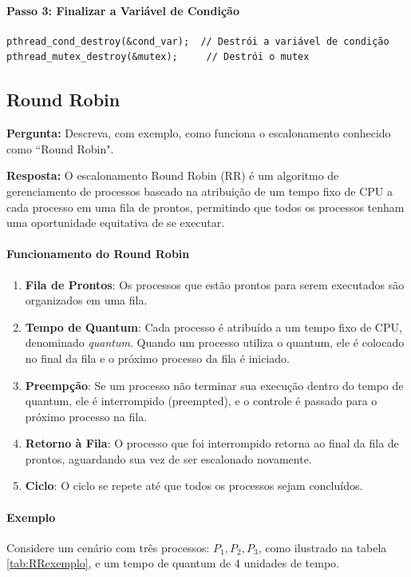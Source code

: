 \documentclass{article}
\begin{document}
\paragraph{Passo 3: Finalizar a Variável de Condição}
\begin{verbatim}
pthread_cond_destroy(&cond_var);  // Destrói a variável de condição
pthread_mutex_destroy(&mutex);     // Destrói o mutex
\end{verbatim}

\subsection{Round Robin}
\textbf{Pergunta:} Descreva, com exemplo, como funciona o escalonamento conhecido como “Round Robin".\newline

\textbf{Resposta:} O escalonamento Round Robin (RR) é um algoritmo de gerenciamento de processos baseado na atribuição de um tempo fixo de CPU a cada processo em uma fila de prontos, permitindo que todos os processos tenham uma oportunidade equitativa de se executar. 

\paragraph{Funcionamento do Round Robin}

\begin{enumerate}
    \item \textbf{Fila de Prontos}: Os processos que estão prontos para serem executados são organizados em uma fila.
    \item \textbf{Tempo de Quantum}: Cada processo é atribuído a um tempo fixo de CPU, denominado \textit{quantum}. Quando um processo utiliza o quantum, ele é colocado no final da fila e o próximo processo da fila é iniciado.
    \item \textbf{Preempção}: Se um processo não terminar sua execução dentro do tempo de quantum, ele é interrompido (preempted), e o controle é passado para o próximo processo na fila.
    \item \textbf{Retorno à Fila}: O processo que foi interrompido retorna ao final da fila de prontos, aguardando sua vez de ser escalonado novamente.
    \item \textbf{Ciclo}: O ciclo se repete até que todos os processos sejam concluídos.
\end{enumerate}

\paragraph{Exemplo} Considere um cenário com três processos: \( P_1, P_2, P_3 \), como ilustrado na tabela \ref{tab:RRexemplo}, e um tempo de quantum de 4 unidades de tempo.
\end{document}
